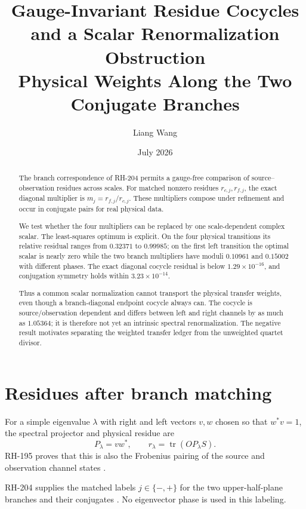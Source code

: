 \documentclass[12pt]{article}
\title{Gauge-Invariant Residue Cocycles and a Scalar Renormalization Obstruction\\
\large Physical Weights Along the Two Conjugate Branches}
\author{Liang Wang}\date{July 2026}
\theoremstyle{remark}\newtheorem{remark}[theorem]{Remark}
\begin{document}
\maketitle
\begin{abstract}
The branch correspondence of RH-204 permits a gauge-free comparison of
source--observation residues across scales.  For matched nonzero residues
$r_{c,j},r_{f,j}$, the exact diagonal multiplier is
$m_j=r_{f,j}/r_{c,j}$.  These multipliers compose under refinement and occur
in conjugate pairs for real physical data.

We test whether the four multipliers can be replaced by one scale-dependent
complex scalar.  The least-squares optimum is explicit.  On the four
physical transitions its relative residual ranges from $0.32371$ to
$0.99985$; on the first left transition the optimal scalar is nearly zero
while the two branch multipliers have moduli $0.10961$ and $0.15002$ with
different phases.  The exact diagonal cocycle residual is below
$1.29\times10^{-16}$, and conjugation symmetry holds within
$3.23\times10^{-14}$.

Thus a common scalar normalization cannot transport the physical transfer
weights, even though a branch-diagonal endpoint cocycle always can.  The
cocycle is source/observation dependent and differs between left and right
channels by as much as $1.05364$; it is therefore not yet an intrinsic
spectral renormalization.  The negative result motivates separating the
weighted transfer ledger from the unweighted quartet divisor.
\end{abstract}

\section{Residues after branch matching}

For a simple eigenvalue $\lambda$ with right and left vectors $v,w$ chosen
so that $w^*v=1$, the spectral projector and physical residue are
\begin{equation}\label{eq:residue}
 P_\lambda=vw^*,\qquad
 r_\lambda=\operatorname{tr}(OP_\lambda S).
\end{equation}
RH-195 proves that this is also the Frobenius pairing of the source and
observation channel states \citep{WangRH195}.

RH-204 supplies the matched labels $j\in\{-,+\}$ for the two
upper-half-plane branches and their conjugates \citep{WangRH204}.  No
eigenvector phase is used in this labeling.
\end{document}
